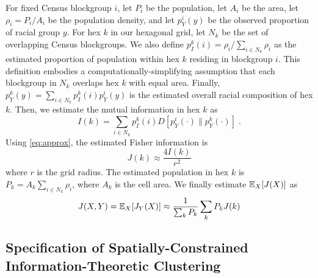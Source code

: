 	For fixed Census blockgroup $i$, let $P_i$ be the population, let $A_i$ be the area, let $\rho_i = P_i / A_i$ be the population density, and let $p^i_Y(y)$ be the observed proportion of racial group $y$. For hex $k$ in our hexagonal grid, let $N_k$ be the set of overlapping Census blockgroups. We also define $p^{k}_I(i) = \rho_i / \sum_{i \in N_k} \rho_i$ as the estimated proportion of population within hex $k$ residing in blockgroup $i$. This definition embodies a computationally-simplifying assumption that each blockgroup in $N_k$ overlaps hex $k$ with equal area. Finally, $p^k_Y(y) = \sum_{i \in N_k} p^{k}_I(i) p^i_Y(y)$ is the estimated overall racial composition of hex $k$. Then, we estimate the mutual information in hex $k$ as 
	\begin{equation}
		I(k) = \sum_{i \in N_k} p^k_I(i) D[p^i_Y(\cdot) \| p^k_Y(\cdot)]\;. 
	\end{equation}
	Using \eqref{eq:approx}, the estimated Fisher information is 
	\begin{equation}
		J(k) \approx \frac{4 I(k)}{r^2}
	\end{equation}
	where $r$ is the grid radius. The estimated population in hex $k$ is $P_k = A_k\sum_{i \in N_k} \rho_i$, where $A_k$ is the cell area. We finally estimate $\mathbb{E}_X[J(X)]$ as 
	\begin{equation}
		J(X,Y) = \mathbb{E}_X[J_Y(X)] \approx \frac{1}{\sum_k P_k} \sum_k P_k J(k)
	\end{equation}


\subsection{Specification of Spatially-Constrained Information-Theoretic Clustering}
